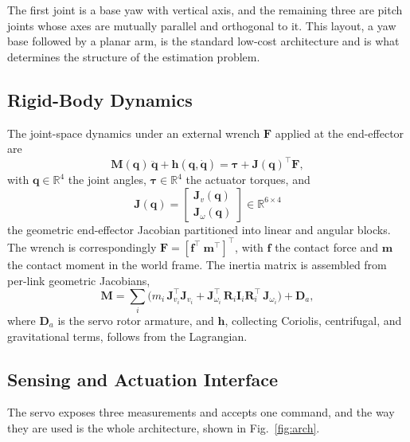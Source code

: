 \documentclass{ieeeaccess}
\newcommand{\R}{\mathbb{R}}
\newcommand{\Jv}{\bm{J}_{\!v}}
\newcommand{\Jw}{\bm{J}_{\!\omega}}
\newcommand{\Jfull}{\bm{J}}
\begin{document}
The first joint is a base yaw with vertical axis, and the remaining three are
pitch joints whose axes are mutually parallel and orthogonal to it. This layout, a
yaw base followed by a planar arm, is the standard low-cost architecture and is
what determines the structure of the estimation problem.

\subsection{Rigid-Body Dynamics}
The joint-space dynamics under an external wrench $\bm F$ applied at the
end-effector are
\begin{equation}
\bm M(\bm q)\,\ddot{\bm q}+\bm h(\bm q,\dot{\bm q})
=\bm\tau+\Jfull(\bm q)^{\!\top}\bm F ,
\label{eq:dyn}
\end{equation}
with $\bm q\in\R^4$ the joint angles, $\bm\tau\in\R^4$ the actuator torques, and
\begin{equation}
\Jfull(\bm q)=\begin{bmatrix}\Jv(\bm q)\\ \Jw(\bm q)\end{bmatrix}\in\R^{6\times4}
\label{eq:jac}
\end{equation}
the geometric end-effector Jacobian partitioned into linear and angular blocks.
The wrench is correspondingly $\bm F=[\bm f^{\!\top}\ \bm m^{\!\top}]^{\!\top}$,
with $\bm f$ the contact force and $\bm m$ the contact moment in the world frame.
The inertia matrix is assembled from per-link geometric Jacobians,
\begin{equation}
\bm M=\sum_i \Big( m_i\,\bm J_{v_i}^{\!\top}\bm J_{v_i}
+\bm J_{\omega_i}^{\!\top}\,\bm R_i\bm I_i\bm R_i^{\!\top}\,\bm J_{\omega_i}\Big)
+\bm D_a ,
\label{eq:inertia}
\end{equation}
where $\bm D_a$ is the servo rotor armature, and $\bm h$, collecting Coriolis,
centrifugal, and gravitational terms, follows from the Lagrangian.

\subsection{Sensing and Actuation Interface}
\label{sec:interface}
The servo exposes three measurements and accepts one command, and the way they are
used is the whole architecture, shown in Fig.~\ref{fig:arch}.
\end{document}
